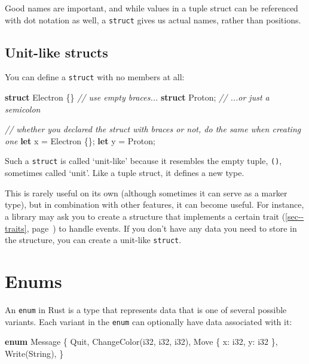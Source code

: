 \documentclass[a4paper,]{book}
\renewcommand*{\hypertarget}[3][\ar]{%
  \def\ar{#2}%
  \label{#1}%
  #3}
\renewcommand*{\hyperlink}[2]{%
 #2 (\autoref{#1}, page~\pageref{#1})}
\newenvironment{Shaded}{\begin{snugshade}}{\end{snugshade}}
\newcommand{\KeywordTok}[1]{\textcolor[rgb]{0.13,0.29,0.53}{\textbf{{#1}}}}
\newcommand{\DataTypeTok}[1]{\textcolor[rgb]{0.13,0.29,0.53}{{#1}}}
\newcommand{\CommentTok}[1]{\textcolor[rgb]{0.56,0.35,0.01}{\textit{{#1}}}}
\newcommand{\NormalTok}[1]{{#1}}
\begin{document}
Good names are important, and while values in a tuple struct can be
referenced with dot notation as well, a \texttt{struct} gives us actual
names, rather than positions.

\subsection{Unit-like structs}\label{unit-like-structs}

You can define a \texttt{struct} with no members at all:

\begin{Shaded}
\begin{Highlighting}[]
\KeywordTok{struct} \NormalTok{Electron \{\} }\CommentTok{// use empty braces...}
\KeywordTok{struct} \NormalTok{Proton;     }\CommentTok{// ...or just a semicolon}

\CommentTok{// whether you declared the struct with braces or not, do the same when creating one}
\KeywordTok{let} \NormalTok{x = Electron \{\};}
\KeywordTok{let} \NormalTok{y = Proton;}
\end{Highlighting}
\end{Shaded}

Such a \texttt{struct} is called `unit-like' because it resembles the
empty tuple, \texttt{()}, sometimes called `unit'. Like a tuple struct,
it defines a new type.

This is rarely useful on its own (although sometimes it can serve as a
marker type), but in combination with other features, it can become
useful. For instance, a library may ask you to create a structure that
implements a certain \protect\hyperlink{sec--traits}{trait} to handle
events. If you don't have any data you need to store in the structure,
you can create a unit-like \texttt{struct}.

\hypertarget{sec--enums}{\section{Enums}\label{sec--enums}}

An \texttt{enum} in Rust is a type that represents data that is one of
several possible variants. Each variant in the \texttt{enum} can
optionally have data associated with it:

\begin{Shaded}
\begin{Highlighting}[]
\KeywordTok{enum} \NormalTok{Message \{}
    \NormalTok{Quit,}
    \NormalTok{ChangeColor(}\DataTypeTok{i32}\NormalTok{, }\DataTypeTok{i32}\NormalTok{, }\DataTypeTok{i32}\NormalTok{),}
    \NormalTok{Move \{ x: }\DataTypeTok{i32}\NormalTok{, y: }\DataTypeTok{i32} \NormalTok{\},}
    \NormalTok{Write(}\DataTypeTok{String}\NormalTok{),}
\NormalTok{\}}
\end{Highlighting}
\end{Shaded}
\end{document}
